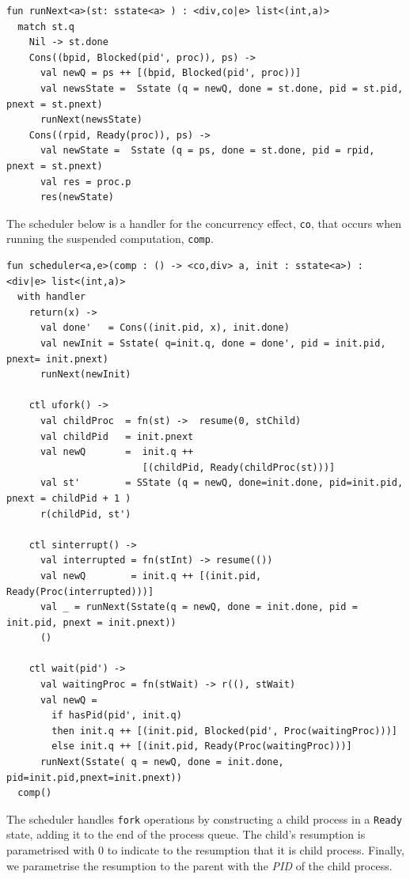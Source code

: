 \documentclass[logo,bsc,singlespacing,parskip]{infthesis}
\begin{document}
\begin{lstlisting}
fun runNext<a>(st: sstate<a> ) : <div,co|e> list<(int,a)> 
  match st.q
    Nil -> st.done
    Cons((bpid, Blocked(pid', proc)), ps) -> 
      val newQ = ps ++ [(bpid, Blocked(pid', proc))]
      val newsState =  Sstate (q = newQ, done = st.done, pid = st.pid, pnext = st.pnext)
      runNext(newsState) 
    Cons((rpid, Ready(proc)), ps) -> 
      val newState =  Sstate (q = ps, done = st.done, pid = rpid, pnext = st.pnext)
      val res = proc.p
      res(newState)
\end{lstlisting}

The scheduler below is a handler for the concurrency effect, \lstinline{co}, that occurs when running the suspended computation, \lstinline{comp}. 


\begin{lstlisting}
fun scheduler<a,e>(comp : () -> <co,div> a, init : sstate<a>) : <div|e> list<(int,a)>
  with handler
    return(x) -> 
      val done'   = Cons((init.pid, x), init.done)
      val newInit = Sstate( q=init.q, done = done', pid = init.pid, pnext= init.pnext)
      runNext(newInit)

    ctl ufork() -> 
      val childProc  = fn(st) ->  resume(0, stChild)  
      val childPid   = init.pnext
      val newQ       =  init.q ++ 
                        [(childPid, Ready(childProc(st)))]
      val st'        = SState (q = newQ, done=init.done, pid=init.pid, pnext = childPid + 1 )
      r(childPid, st')

    ctl sinterrupt() ->
      val interrupted = fn(stInt) -> resume(())
      val newQ        = init.q ++ [(init.pid, Ready(Proc(interrupted)))]
      val _ = runNext(Sstate(q = newQ, done = init.done, pid = init.pid, pnext = init.pnext))
      ()

    ctl wait(pid') ->
      val waitingProc = fn(stWait) -> r((), stWait)
      val newQ =
        if hasPid(pid', init.q)
        then init.q ++ [(init.pid, Blocked(pid', Proc(waitingProc)))]
        else init.q ++ [(init.pid, Ready(Proc(waitingProc)))]
      runNext(Sstate( q = newQ, done = init.done, pid=init.pid,pnext=init.pnext))      
  comp()
\end{lstlisting}    
The scheduler handles \lstinline{fork} operations by constructing a child process in a \lstinline{Ready} state, adding it to the end of the process queue. The child's resumption is parametrised with 0 to indicate to the resumption that it is child process. Finally, we parametrise the resumption to the parent with the \textit{PID} of the child process.
\end{document}
